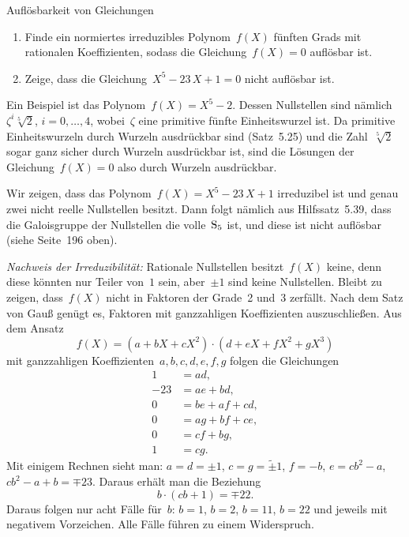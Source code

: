 \documentclass{algblatt}
\begin{document}
\begin{aufgabe}{Auflösbarkeit von Gleichungen}
\begin{enumerate}
\item Finde ein normiertes irreduzibles Polynom~$f(X)$ fünften Grads mit
rationalen Koeffizienten, sodass die Gleichung~$f(X) = 0$ auflösbar ist.
\item Zeige, dass die Gleichung~$X^5 - 23\,X + 1 = 0$ nicht auflösbar ist.
\end{enumerate}

\begin{loesungE}
\item Ein Beispiel ist das Polynom~$f(X) = X^5 - 2$. Dessen Nullstellen sind
nämlich~$\zeta^i \sqrt[5]{2}$, $i = 0,\ldots,4$, wobei~$\zeta$ eine primitive
fünfte Einheitswurzel ist. Da primitive Einheitswurzeln durch Wurzeln
ausdrückbar sind (Satz~5.25) und die Zahl~$\sqrt[5]{2}$ sogar ganz sicher durch
Wurzeln ausdrückbar ist, sind die Lösungen der Gleichung~$f(X) = 0$ also durch
Wurzeln ausdrückbar.

\item Wir zeigen, dass das Polynom~$f(X) = X^5 - 23\,X + 1$ irreduzibel ist und
genau zwei nicht reelle Nullstellen besitzt. Dann folgt nämlich aus
Hilfssatz~5.39, dass die Galoisgruppe der Nullstellen die volle~$\mathrm{S}_5$ ist,
und diese ist nicht auflösbar (siehe Seite~196 oben).

\emph{Nachweis der Irreduzibilität:} Rationale Nullstellen besitzt~$f(X)$
keine, denn diese könnten nur Teiler von~$1$ sein, aber~$\pm 1$ sind keine
Nullstellen. Bleibt zu zeigen, dass~$f(X)$ nicht in Faktoren der Grade~2
und~3 zerfällt. Nach dem Satz von Gauß genügt es, Faktoren mit ganzzahligen
Koeffizienten auszuschließen. Aus dem Ansatz
\[ f(X) = (a + bX + cX^2) \cdot (d + eX + fX^2 + gX^3) \]
mit ganzzahligen Koeffizienten~$a,b,c,d,e,f,g$ folgen die Gleichungen
\begin{align*}
  1 &= ad, \\
  -23 &= ae + bd, \\
  0 &= be + af + cd, \\
  0 &= ag + bf + ce, \\
  0 &= cf + bg, \\
  1 &= cg.
\end{align*}
Mit einigem Rechnen sieht man: $a = d = \pm 1$, $c = g = {\tilde\pm} 1$, $f =
-b$, $e = cb^2 - a$, $cb^2 - a + b = \mp 23$. Daraus erhält man die Beziehung
\[ b \cdot (cb + 1) = \mp 22. \]
Daraus folgen nur acht Fälle für~$b$: $b = 1$, $b = 2$, $b = 11$, $b = 22$ und
jeweils mit negativem Vorzeichen. Alle Fälle führen zu einem Widerspruch.


\end{loesungE}
\end{aufgabe}
\end{document}
